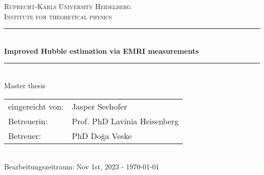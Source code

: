 
\begin{titlepage}
  \begin{center}

    \textsc{\LARGE
      Ruprecht-Karls University Heidelberg}\\[1cm]

    \textsc{Institute for theoretical physics}\\[3cm]

    \rule{\linewidth}{0.5mm}\\[1cm]

    { \huge \bfseries Improved Hubble estimation via EMRI measurements} \\[1cm]

    \rule{\linewidth}{0.5mm}\\[0.5cm]

    Master thesis \\[3cm]

    \begin{tabular}{l l}
      eingereicht von: & Jasper Seehofer              \\
      Betreuerin:      & Prof. PhD Lavinia Heisenberg \\
      Betreuer:        & PhD Do\u{g}a Veske           \\
    \end{tabular}\\[1cm]

    Bearbeitungszeitraum: Nov 1st, 2023 - \today
  \end{center}
\end{titlepage}
